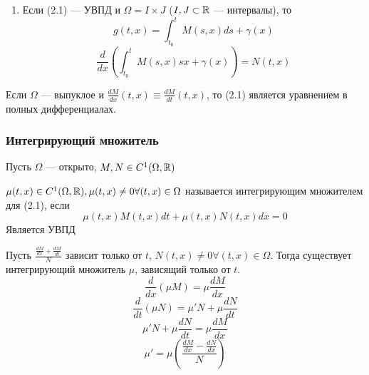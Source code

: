 \begin{enumerate}
    \item Если (2.1) --- УВПД и \(\Omega = I \times J\) (\(I, J \subset \mathbb{R}\) --- интервалы), то
    \[g(t, x) = \int_{t_0}^t M(s, x)ds + \gamma(x)\]
    \[\frac{d}{dx}\left(\int_{t_0}^t M(s, x)sx + \gamma(x)\right) = N(t, x)\]
\end{enumerate}

\begin{theorem}
    Если \(\Omega\) --- выпуклое и \(\frac{dM}{dx}(t, x) \equiv \frac{dM}{dt}(t, x)\), то (2.1) является уравнением в полных дифференциалах.
\end{theorem}

\subsubsection{Интегрирующий множитель}
Пусть \(\Omega\) --- открыто, \(M, N \in C^1(\Omega, \mathbb{R})\)
\begin{definition}
    \(\mu(t, x) \in C^1(\Omega, \mathbb{R}), \mu(t, x) \ne 0 \forall (t, x) \in \Omega\) называется интегрирующим множителем для (2.1), если 
    \[\mu(t, x)M(t, x)dt + \mu(t, x)N(t, x)dx = 0\]
    Является УВПД
\end{definition}

\begin{proposition}
    Пусть \(\frac{\frac{dM}{dx} + \frac{dM}{dt}}{N}\) зависит только от \(t\), \(N(t, x) \ne 0 \forall (t, x) \in \Omega\). Тогда существует интегрирующий множитель \(\mu\), зависящий только от \(t\).
    \[\frac{d}{dx}(\mu M) = \mu \frac{dM}{dx}\]
    \[\frac{d}{dt}(\mu N) = \mu' N + \mu \frac{dN}{dt}\]
    \[\mu'N + \mu \frac{dN}{dt} = \mu \frac{dM}{dx}\]
    \[\mu' = \mu\left(\frac{\frac{dM}{dx} - \frac{dN}{dx}}{N}\right)\]
\end{proposition}
